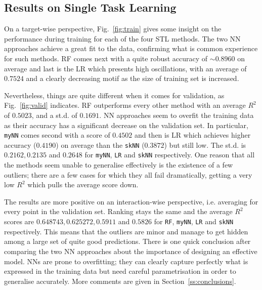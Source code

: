 \documentclass[10pt]{article}
\begin{document}
\subsection{Results on Single Task Learning}
On a target-wise perspective, Fig.~\ref{fig:train} gives some insight on the performance during training for each of the four STL methods. The two NN approaches achieve a great fit to the data, confirming what is common experience for such methods. RF comes next with a quite robust accuracy of $\sim 0.8960$ on average and last is the LR which presents high oscillations, with an average of  $0.7524$ and a clearly decreasing motif as the size of training set is increased. 

Nevertheless, things are quite different when it comes for validation, as Fig.~\ref{fig:valid} indicates. RF outperforms every other method with an average $R^2$ of $ 0.5023$, and a st.d. of $0.1691$. NN approaches seem to overfit the training data as their accuracy has a significant decrease on the validation set. In particular, \texttt{myNN} comes second with a score of $0.4502$ and then is LR which achieves higher accuracy ($0.4190$) on average than the \texttt{skNN} ($0.3872$) but still low. The st.d. is $0.2162, 0.2135$ and $0.2648$ for \texttt{myNN}, \texttt{LR} and \texttt{skNN} respectively. One reason that all the methods seem unable to generalise effectively is the existence of a few outliers; there are a few cases for which they all fail dramatically, getting a very low $R^2$ which pulls the average score down. 

The results are more positive on an interaction-wise perspective, i.e. averaging for every point in the validation set. Ranking stays the same and the average $R^2$ scores are $0.648743, 0.625272, 0.5911$ and  $0.5826$ for \texttt{RF}, \texttt{myNN}, \texttt{LR} and \texttt{skNN} respectively. This means that the outliers are minor and manage to get hidden among a large set of quite good predictions. There  is one quick conclusion after comparing the two NN approaches about the importance of designing an effective model. NNs are prone to overfitting; they can clearly capture perfectly what is expressed in the training data but need careful parametrisation in order to generalise accurately. More comments are given in Section~\ref{ss:conclusions}.
\end{document}
